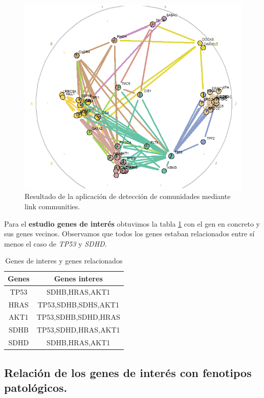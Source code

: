 \begin{figure}
	\centering
	\includegraphics[width=0.8\linewidth]{figures/link}
	\caption{Resultado de la aplicación de detección de comunidades mediante link communities.}
	\label{fig:link}
\end{figure}



Para el \textbf{estudio genes de interés} obtuvimos la tabla \ref{tab:genesinteres} con el gen en concreto y sus genes vecinos. Observamos que todos los genes estaban relacionados entre sí menos el caso de \textit{TP53} y \textit{SDHD}. 

\begin{table}[h]
	\centering
	\caption{Genes de interes y genes relacionados}
	\begin{tabular}{|c|c|}
		\hline
		\textbf{Genes} & \textbf{Genes interes} \\
		\hline
		TP53 & SDHB,HRAS,AKT1 \\
		\hline
		HRAS & TP53,SDHB,SDHS,AKT1 \\
		\hline
		AKT1 & TP53,SDHB,SDHD,HRAS \\
		\hline
		SDHB & TP53,SDHD,HRAS,AKT1 \\
		\hline
		SDHD & SDHB,HRAS,AKT1 \\
		\hline
	\end{tabular}
	\label{tab:genesinteres}
\end{table}

\subsection{Relación de los genes de interés con fenotipos patológicos.}

